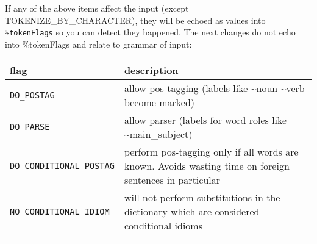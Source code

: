 \documentclass[]{article}
\begin{document}
If any of the above items affect the input (except
TOKENIZE\_BY\_CHARACTER), they will be echoed as values into
\texttt{\%tokenFlags} so you can detect they happened. The next changes
do not echo into \%tokenFlags and relate to grammar of input:

\begin{longtable}[]{@{}ll@{}}
\toprule
\begin{minipage}[b]{0.28\columnwidth}\raggedright\strut
flag\strut
\end{minipage} & \begin{minipage}[b]{0.67\columnwidth}\raggedright\strut
description\strut
\end{minipage}\tabularnewline
\midrule
\endhead
\begin{minipage}[t]{0.28\columnwidth}\raggedright\strut
\texttt{DO\_POSTAG}\strut
\end{minipage} & \begin{minipage}[t]{0.67\columnwidth}\raggedright\strut
allow pos-tagging (labels like \textasciitilde{}noun
\textasciitilde{}verb become marked)\strut
\end{minipage}\tabularnewline
\begin{minipage}[t]{0.28\columnwidth}\raggedright\strut
\texttt{DO\_PARSE}\strut
\end{minipage} & \begin{minipage}[t]{0.67\columnwidth}\raggedright\strut
allow parser (labels for word roles like
\textasciitilde{}main\_subject)\strut
\end{minipage}\tabularnewline
\begin{minipage}[t]{0.28\columnwidth}\raggedright\strut
\texttt{DO\_CONDITIONAL\_POSTAG}\strut
\end{minipage} & \begin{minipage}[t]{0.67\columnwidth}\raggedright\strut
perform pos-tagging only if all words are known. Avoids wasting time on
foreign sentences in particular\strut
\end{minipage}\tabularnewline
\begin{minipage}[t]{0.28\columnwidth}\raggedright\strut
\texttt{NO\_CONDITIONAL\_IDIOM}\strut
\end{minipage} & \begin{minipage}[t]{0.67\columnwidth}\raggedright\strut
will not perform substitutions in the dictionary which are considered
conditional idioms\strut
\end{minipage}\tabularnewline
\begin{minipage}[t]{0.28\columnwidth}\raggedright\strut

\end{minipage}
\end{longtable}
\end{document}
